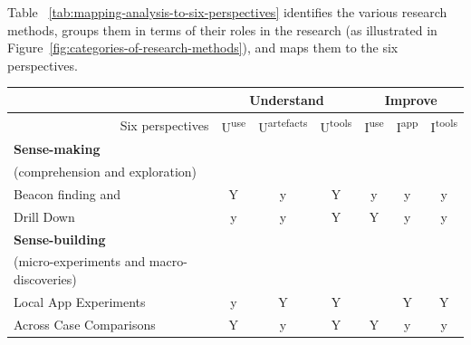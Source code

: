Table ~\ref{tab:mapping-analysis-to-six-perspectives} identifies the various research methods, groups them in terms of their roles in the research (as illustrated in Figure~\ref{fig:categories-of-research-methods}), and maps them to the six perspectives.  


\begin{table}
    \small
    \setlength{\tabcolsep}{4pt} %
    \setlength{\arrayrulewidth}{0.1mm}
    \centering
    \begin{tabular}{l|ccc|ccc}
      & \multicolumn{3}{c|}{\bfseries \small Understand} & \multicolumn{3}{c}{\bfseries \small Improve} \\
      \toprule
         \multicolumn{1}{r|}{Six perspectives} &U\textsuperscript{use} &U\textsuperscript{artefacts} &U\textsuperscript{tools} &I\textsuperscript{use} &I\textsuperscript{app} &I\textsuperscript{tools} \\ %
         
        \hline 
        \textbf{Sense-making} & & & & & & \\
        (comprehension and exploration) & & & & & & \\
        Beacon finding and    &Y &y &Y &y &y &y \\
        Drill Down            &y &y &Y &Y &y &y \\

        \hline
        \textbf{Sense-building} & & & & & & \\      
        (micro-experiments and macro-discoveries) & & & & & & \\
        Local App Experiments   &y &Y &Y &  &Y &Y \\
        Across Case Comparisons &Y &y &Y &Y &y &y \\        
        

\end{tabular}
\end{table}
